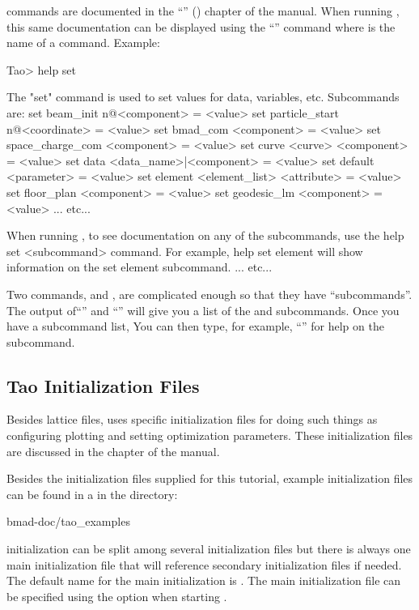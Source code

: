 \documentclass{hitec}     %
\begin{document}
\tao commands are documented in the ``'' () chapter of the \tao
manual.  When running \tao, this same documentation can be displayed using the ``'' command where  is the name of a command. Example:
\begin{code}
Tao> help set

The "set" command is used to set values for data, variables, etc. 
Subcommands are:
  set beam_init {n@}<component> = <value>
  set particle_start {n@}<coordinate> = <value>
  set bmad_com <component> = <value>
  set space_charge_com <component> = <value>
  set curve <curve> <component> = <value>
  set data <data_name>|<component> = <value>
  set default <parameter> = <value>
  set element <element_list> <attribute> = <value>
  set floor_plan <component> = <value>
  set geodesic_lm <component> = <value>
... etc...

When running \tao, to see documentation on any of the subcommands, use the 
help set <subcommand> command. For example, help set element
will show information on the set element subcommand.
... etc...
\end{code}

Two commands,  and , are complicated enough so that they have ``subcommands''. The
output of``'' and ``'' will give you a list of the  and 
subcommands. Once you have a subcommand list, You can then type, for example, ``'' for help on the  subcommand.

\subsection{Tao Initialization Files}
\label{s:init.file}

Besides lattice files, \tao uses \tao specific initialization files for doing such things as
configuring plotting and setting optimization parameters. These initialization files are discussed
in the  chapter of the \tao manual.

Besides the initialization files supplied for this tutorial, example \tao initialization files can
be found in a  in the directory:
\begin{code}
bmad-doc/tao_examples
\end{code}

\tao initialization can be split among several initialization files but there is always one main
initialization file that will reference secondary initialization files if needed. The default name
for the main initialization is . The main initialization file can be specified using
the  option when starting \tao.
\end{document}
